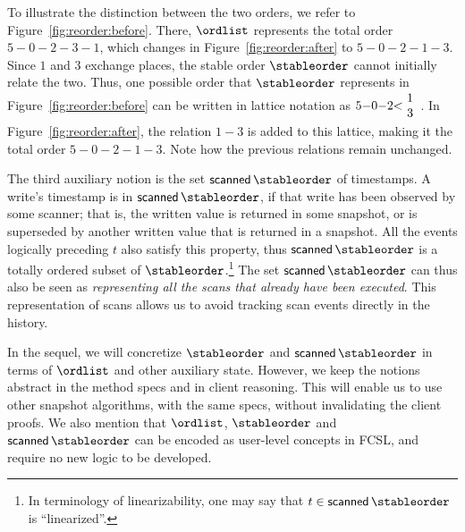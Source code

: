 %

To illustrate the distinction between the two orders, we refer to
Figure~\ref{fig:reorder:before}. There, $\ordlist$ represents the
total order $5{-}0{-}2{-}3{-}1$, which changes in
Figure~\ref{fig:reorder:after} to $5{-}0{-}2{-}1{-}3$.
%
Since $1$ and $3$ exchange places, the stable order $\stableorder$
cannot initially relate the two. Thus, one possible order that
$\stableorder$ represents in Figure~\ref{fig:reorder:before} can be
written in lattice notation as
$5{-}0{-}2{<}\!\begin{array}[c]{c}1\\ 3\end{array}$. In
Figure~\ref{fig:reorder:after}, the relation $1{-}3$ is added to this
lattice, making it the total order $5{-}0{-}2{-}1{-}3$. Note how the
previous relations remain unchanged.

\newcommand{\scanned}[1]{\mathsf{scanned}\,#1}

The third auxiliary notion is the set $\scanned\stableorder$ of
timestamps. A write's timestamp is in $\scanned\stableorder$, if that
write has been observed by some scanner; that is, the written value is
returned in some snapshot, or is superseded by another written value
that is returned in a snapshot. All the events logically preceding $t$
also satisfy this property, thus $\scanned\stableorder$ is a totally
ordered subset of $\stableorder$.\footnote{In terminology of
  linearizability, one may say that $t \in \scanned\stableorder$ is
  ``linearized''.}  The set $\scanned\stableorder$ can thus also be
seen as \emph{representing all the scans that already have been
  executed}. This representation of scans allows us to avoid tracking
scan events directly in the history.

In the sequel, we will concretize $\stableorder$ and
$\scanned\stableorder$ in terms of $\ordlist$ and other auxiliary
state. However, we keep the notions abstract in the method specs and
in client reasoning. This will enable us to use other snapshot
algorithms, with the same specs, without invalidating the client
proofs. We also mention that $\ordlist$, $\stableorder$ and
$\scanned\stableorder$ can be encoded as user-level concepts in FCSL,
and require no new logic to be developed.

